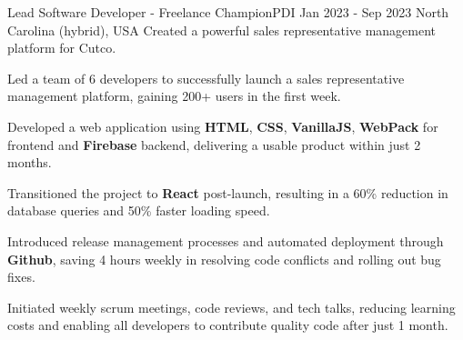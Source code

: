 
\begin{cventries}
  \cventry
    {Lead Software Developer - Freelance} %
    {ChampionPDI} %
    {Jan 2023 - Sep 2023} %
    {North Carolina (hybrid), USA} %
    {Created a powerful sales representative management platform for Cutco.}
    {
      \begin{cvitems} %
        \item {Led a team of 6 developers to successfully launch a sales representative management platform, gaining 200+ users in the first week.}
        \item {Developed a web application using \textbf{HTML}, \textbf{CSS}, \textbf{VanillaJS}, \textbf{WebPack} for frontend and \textbf{Firebase} backend, delivering a usable product within just 2 months.}
        \item {Transitioned the project to \textbf{React} post-launch, resulting in a 60\% reduction in database queries and 50\% faster loading speed.}
        \item {Introduced release management processes and automated deployment through \textbf{Github}, saving 4 hours weekly in resolving code conflicts and rolling out bug fixes.}
        \item {Initiated weekly scrum meetings, code reviews, and tech talks, reducing learning costs and enabling all developers to contribute quality code after just 1 month.}
      \end{cvitems}
    }


\end{cventries}
